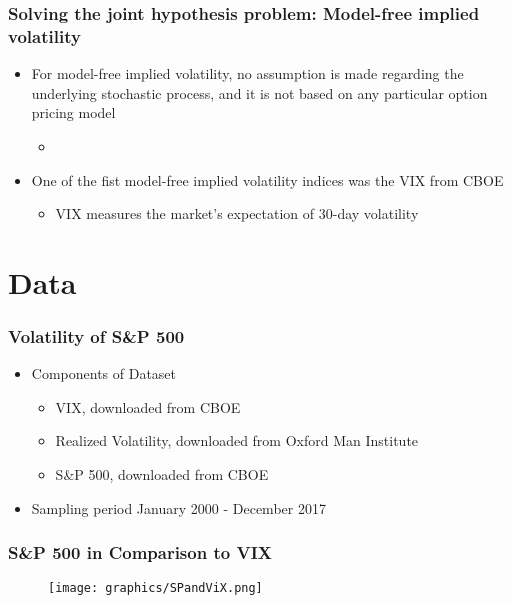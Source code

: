 \documentclass[aspectratio=169]{beamer}
\begin{document}
\begin{frame}
\frametitle{Solving the joint hypothesis problem: Model-free implied volatility}
	\begin{itemize}
	\item For model-free implied volatility, no assumption is made regarding the underlying stochastic process, and it is not based on any particular option pricing model
		\begin{itemize}
		\pro The VIX includes information from both at-the-money and out-of-money options
		\pro As no pricing assumption is made, the model-free implied volatility provides a direct test of the informational efficiency of the options market
		\item 
		\end{itemize}
	\item One of the fist model-free implied volatility indices was the VIX from CBOE \parencite{exchange2009}
		\begin{itemize}
		\item VIX measures the market's expectation of 30-day volatility
		\end{itemize}
	\end{itemize}
\end{frame}

\section{Data}

\begin{frame}
\frametitle{Volatility of S\&P 500}
	\begin{itemize}
	\item Components of Dataset
		\begin{itemize}
		\item VIX, downloaded from CBOE
		\item Realized Volatility, downloaded from Oxford Man Institute
		\item S\&P 500, downloaded from CBOE
		\end{itemize}
	\item Sampling period January 2000 - December 2017
	\end{itemize}
\end{frame}

\begin{frame}
\frametitle{S\&P 500 in Comparison to VIX}
	\begin{figure}
	\centering
	\texttt{[image: graphics/SPandViX.png]}
	\end{figure}
\end{frame}
\end{document}
